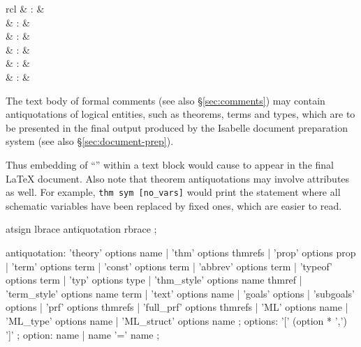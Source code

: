 \begin{isabellebody}
\begin{isamarkuptext}
\begin{matharray}{rcl}
     & : & \isarantiq \\
     & : & \isarantiq \\
     & : & \isarantiq \\
     & : & \isarantiq \\
     & : & \isarantiq \\
     & : & \isarantiq \\
  \end{matharray}

  The text body of formal comments (see also \S\ref{sec:comments}) may
  contain antiquotations of logical entities, such as theorems, terms
  and types, which are to be presented in the final output produced by
  the Isabelle document preparation system (see also
  \S\ref{sec:document-prep}).

  Thus embedding of ``''
  within a text block would cause
   to appear in the final {\LaTeX} document.  Also note that theorem
  antiquotations may involve attributes as well.  For example,
  \texttt{{\at}{\ttlbrace}thm~sym~[no_vars]{\ttrbrace}} would print
  the statement where all schematic variables have been replaced by
  fixed ones, which are easier to read.

  \begin{rail}
    atsign lbrace antiquotation rbrace
    ;

    antiquotation:
      'theory' options name |
      'thm' options thmrefs |
      'prop' options prop |
      'term' options term |
      'const' options term |
      'abbrev' options term |
      'typeof' options term |
      'typ' options type |
      'thm\_style' options name thmref |
      'term\_style' options name term |
      'text' options name |
      'goals' options |
      'subgoals' options |
      'prf' options thmrefs |
      'full\_prf' options thmrefs |
      'ML' options name |
      'ML\_type' options name |
      'ML\_struct' options name
    ;
    options: '[' (option * ',') ']'
    ;
    option: name | name '=' name
    ;
  \end{rail}


\end{isamarkuptext}
\end{isabellebody}

